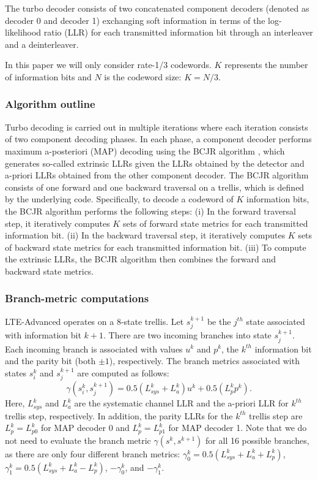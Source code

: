 The turbo decoder consists of two concatenated component decoders (denoted as
decoder 0 and decoder 1) exchanging soft information in terms of the
log-likelihood ratio (LLR) for each transmitted information bit through an
interleaver and a deinterleaver.

In this paper we will only consider rate-1/3 codewords. $K$ represents the
number of information bits and $N$ is the codeword size: $K = N / 3$.

\subsubsection{Algorithm outline}

Turbo decoding is carried out in multiple iterations where each iteration
consists of two component decoding phases. In each phase, a component
decoder performs maximum a-posteriori (MAP) decoding using the BCJR algorithm
\cite{Bahl1974}, which generates so-called extrinsic LLRs given the LLRs
obtained by the detector and a-priori LLRs obtained from the other component
decoder. The BCJR algorithm consists of one forward and one backward traversal
on a trellis, which is defined by the underlying code. Specifically, to decode a
codeword of $K$ information bits, the BCJR algorithm performs the following
steps: (i) In the forward traversal step, it iteratively computes $K$ sets of
forward state metrics for each transmitted information bit. (ii) In the backward
traversal step, it iteratively computes $K$ sets of backward state metrics
for each transmitted information bit. (iii) To compute the extrinsic LLRs, the
BCJR algorithm then combines the forward and backward state metrics.

\subsubsection{Branch-metric computations}

LTE-Advanced operates on a 8-state trellis. Let $s_j^{k+1}$ be the $j^{th}$
state associated with information bit $k+1$. There are two incoming branches
into state $s_j^{k+1}$. Each incoming branch is associated with values $u^k$ and
$p^k$, the $k^{th}$ information bit and the parity bit (both $\pm1$),
respectively. The branch metrics associated with states $s_i^k$ and $s_j^{k+1}$
are computed as follows:
\begin{equation}
\label{eq:turbo_gamma}
 \gamma(s_i^k, s_j^{k+1}) = 0.5(L_{sys}^k + L_a^k)u^k + 0.5(L_p^k p^k).
\end{equation}
Here, $L_{sys}^k$ and $L_a^k$ are the systematic channel LLR and the a-priori
LLR for $k^{th}$ trellis step, respectively. In addition, the parity LLRs for
the $k^{th}$ trellis step are $L_p^k = L_{p0}^k$ for MAP decoder 0 and
$L_p^k = L_{p1}^k$ for MAP decoder 1. Note that we do not need to evaluate the
branch metric $\gamma(s^k , s^{k+1})$ for all 16 possible branches, as there are
only four different branch metrics:
$\gamma^k_0 = 0.5(L_{sys}^k + L_a^k + L_p^k)$,
$\gamma^k_1 = 0.5(L_{sys}^k + L_a^k - L_p^k)$, $-\gamma^k_0$, and $-\gamma^k_1$.

